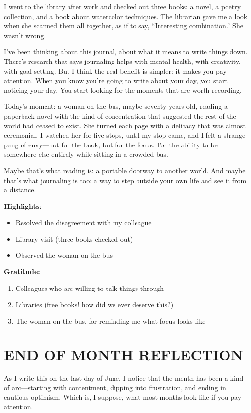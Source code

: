 \documentclass[
    language=english,
    doctype=journal,
    institution=none,
]{../../omnilatex}
\begin{document}
I went to the library after work and checked out three books: a novel, a poetry collection, and a book about watercolor techniques. The librarian gave me a look when she scanned them all together, as if to say, ``Interesting combination.'' She wasn't wrong.

I've been thinking about this journal, about what it means to write things down. There's research that says journaling helps with mental health, with creativity, with goal-setting. But I think the real benefit is simpler: it makes you pay attention. When you know you're going to write about your day, you start noticing your day. You start looking for the moments that are worth recording.

Today's moment: a woman on the bus, maybe seventy years old, reading a paperback novel with the kind of concentration that suggested the rest of the world had ceased to exist. She turned each page with a delicacy that was almost ceremonial. I watched her for five stops, until my stop came, and I felt a strange pang of envy---not for the book, but for the focus. For the ability to be somewhere else entirely while sitting in a crowded bus.

Maybe that's what reading is: a portable doorway to another world. And maybe that's what journaling is too: a way to step outside your own life and see it from a distance.

\textbf{Highlights:}
\begin{itemize}
    \item Resolved the disagreement with my colleague
    \item Library visit (three books checked out)
    \item Observed the woman on the bus
\end{itemize}

\textbf{Gratitude:}
\begin{enumerate}
    \item Colleagues who are willing to talk things through
    \item Libraries (free books! how did we ever deserve this?)
    \item The woman on the bus, for reminding me what focus looks like
\end{enumerate}

\section*{END OF MONTH REFLECTION}

As I write this on the last day of June, I notice that the month has been a kind of arc---starting with contentment, dipping into frustration, and ending in cautious optimism. Which is, I suppose, what most months look like if you pay attention.
\end{document}

